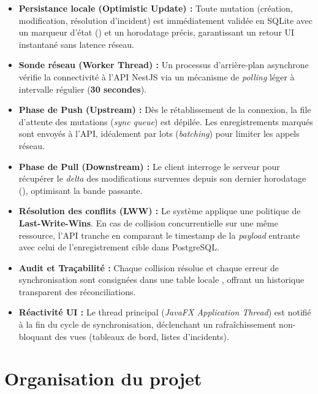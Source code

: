 \documentclass[12pt,a4paper]{article}
\begin{document}
\begin{itemize}
    \item \textbf{Persistance locale (Optimistic Update) :}
          Toute mutation (création, modification, résolution d'incident)
          est immédiatement validée en SQLite avec un marqueur d'état
          () et un horodatage précis,
          garantissant un retour UI instantané sans latence réseau.
    \item \textbf{Sonde réseau (Worker Thread) :}
          Un processus d'arrière-plan asynchrone vérifie la connectivité à l'API NestJS via un mécanisme de
          \textit{polling} léger à intervalle régulier (\textbf{30 secondes}).
    \item \textbf{Phase de Push (Upstream) :}
          Dès le rétablissement de la connexion, la file d'attente des mutations (\textit{sync queue}) est dépilée.
          Les enregistrements marqués  sont envoyés à l'API, idéalement par lots (\textit{batching}) pour limiter les appels réseau.
    \item \textbf{Phase de Pull (Downstream) :}
          Le client interroge le serveur pour récupérer le \textit{delta} des modifications
          survenues depuis son dernier horodatage (),
          optimisant la bande passante.
    \item \textbf{Résolution des conflits (LWW) :} Le système applique une politique de \textbf{Last-Write-Wins}.
          En cas de collision concurrentielle sur une même ressource, l'API tranche en comparant le timestamp de la \textit{payload} entrante
          avec celui de l'enregistrement cible dans PostgreSQL.
    \item \textbf{Audit et Traçabilité :}
          Chaque collision résolue et chaque erreur de synchronisation sont consignées dans une table
          locale , offrant un historique transparent des réconciliations.
    \item \textbf{Réactivité UI :}
          Le thread principal (\textit{JavaFX Application Thread}) est notifié à la fin du cycle de synchronisation,
          déclenchant un rafraîchissement non-bloquant des vues (tableaux de bord, listes d'incidents).
\end{itemize}

\newpage

\section{Organisation du projet}
\end{document}
